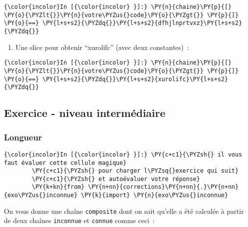     \begin{Verbatim}[commandchars=\\\{\}]
{\color{incolor}In [{\color{incolor} }]:} \PY{n}{chaine}\PY{p}{[} \PY{o}{\PYZlt{}}\PY{n}{votre\PYZus{}code}\PY{o}{\PYZgt{}} \PY{p}{]} \PY{o}{==} \PY{l+s+s2}{\PYZdq{}}\PY{l+s+s2}{dfhjlnprtvxz}\PY{l+s+s2}{\PYZdq{}}
\end{Verbatim}


    \begin{enumerate}
\def\labelenumi{\arabic{enumi})}
\setcounter{enumi}{3}
\tightlist
\item
  Une slice pour obtenir ``xurolifc'' (avec deux constantes)~:
\end{enumerate}

    \begin{Verbatim}[commandchars=\\\{\}]
{\color{incolor}In [{\color{incolor} }]:} \PY{n}{chaine}\PY{p}{[} \PY{o}{\PYZlt{}}\PY{n}{votre\PYZus{}code}\PY{o}{\PYZgt{}} \PY{p}{]} \PY{o}{==} \PY{l+s+s2}{\PYZdq{}}\PY{l+s+s2}{xurolifc}\PY{l+s+s2}{\PYZdq{}}
\end{Verbatim}


    \hypertarget{exercice---niveau-intermuxe9diaire}{%
\subsection{Exercice - niveau
intermédiaire}\label{exercice---niveau-intermuxe9diaire}}

    \hypertarget{longueur}{%
\subsubsection{Longueur}\label{longueur}}

    \begin{Verbatim}[commandchars=\\\{\}]
{\color{incolor}In [{\color{incolor} }]:} \PY{c+c1}{\PYZsh{} il vous faut évaluer cette cellule magique}
        \PY{c+c1}{\PYZsh{} pour charger l\PYZsq{}exercice qui suit}
        \PY{c+c1}{\PYZsh{} et autoévaluer votre réponse}
        \PY{k+kn}{from} \PY{n+nn}{corrections}\PY{n+nn}{.}\PY{n+nn}{exo\PYZus{}inconnue} \PY{k}{import} \PY{n}{exo\PYZus{}inconnue}
\end{Verbatim}


    On vous donne une chaîne \texttt{composite} dont on sait qu'elle a été
calculée à partir de deux chaînes \texttt{inconnue} et \texttt{connue}
comme ceci~:

\begin{Shaded}
\begin{Highlighting}[]
\OperatorTok{=}\OperatorTok{+}\OperatorTok{+}
\end{Highlighting}
\end{Shaded}

